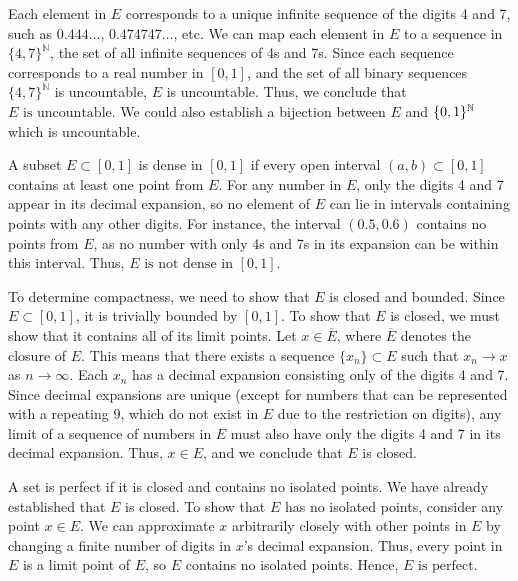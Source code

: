 \documentclass[12pt]{article}
\begin{document}
\begin{exercise}{17}
Each element in \( E \) corresponds to a unique infinite sequence of the digits 4 and 7, such as \( 0.444\ldots \), \( 0.474747\ldots \), etc. We can map each element in \( E \) to a sequence in \(\{4, 7\}^\mathbb{N}\), the set of all infinite sequences of 4s and 7s. Since each sequence corresponds to a real number in \( [0, 1] \), and the set of all binary sequences \(\{4, 7\}^\mathbb{N}\) is uncountable, \( E \) is uncountable. Thus, we conclude that
\(
E \text{ is uncountable}.
\) We could also establish a bijection between $E$ and $\{ 0, 1 \}^{\mathbb{N}}$ which is uncountable. 

A subset \( E \subset [0, 1] \) is dense in \( [0, 1] \) if every open interval \( (a, b) \subset [0, 1] \) contains at least one point from \( E \). For any number in \( E \), only the digits 4 and 7 appear in its decimal expansion, so no element of \( E \) can lie in intervals containing points with any other digits. For instance, the interval \( (0.5, 0.6) \) contains no points from \( E \), as no number with only 4s and 7s in its expansion can be within this interval. Thus,
\( E \text{ is not dense in } [0, 1].
\)

To determine compactness, we need to show that \( E \) is closed and bounded. Since \( E \subset [0,1] \), it is trivially bounded by \( [0, 1] \). To show that \( E \) is closed, we must show that it contains all of its limit points. Let \( x \in \overline{E} \), where \( \overline{E} \) denotes the closure of \( E \). This means that there exists a sequence \( \{x_n\} \subset E \) such that \( x_n \to x \) as \( n \to \infty \). Each \( x_n \) has a decimal expansion consisting only of the digits 4 and 7. Since decimal expansions are unique (except for numbers that can be represented with a repeating 9, which do not exist in \( E \) due to the restriction on digits), any limit of a sequence of numbers in \( E \) must also have only the digits 4 and 7 in its decimal expansion. Thus, \( x \in E \), and we conclude that \( E \) is closed.

A set is perfect if it is closed and contains no isolated points. We have already established that \( E \) is closed. To show that \( E \) has no isolated points, consider any point \( x \in E \). We can approximate \( x \) arbitrarily closely with other points in \( E \) by changing a finite number of digits in \( x \)'s decimal expansion. Thus, every point in \( E \) is a limit point of \( E \), so \( E \) contains no isolated points. Hence,
\(
E \text{ is perfect}.
\)
\end{exercise}
\end{document}

